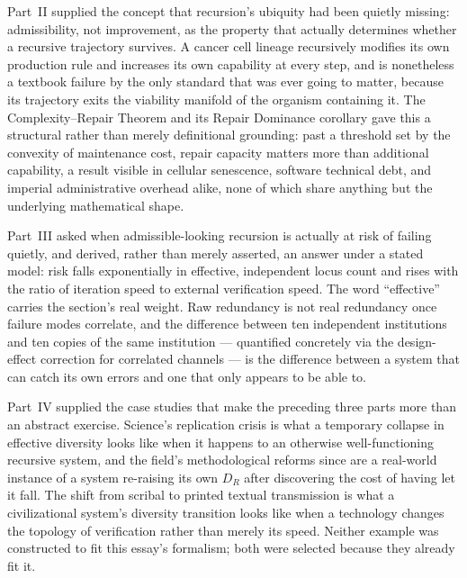 \documentclass[12pt,a4paper]{article}
\theoremstyle{plain}
\theoremstyle{definition}
\theoremstyle{remark}
\newcommand{\DR}{D_R}
\begin{document}
Part~II supplied the concept that recursion's ubiquity had been quietly missing: admissibility, not improvement, as the property that actually determines whether a recursive trajectory survives. A cancer cell lineage recursively modifies its own production rule and increases its own capability at every step, and is nonetheless a textbook failure by the only standard that was ever going to matter, because its trajectory exits the viability manifold of the organism containing it. The Complexity--Repair Theorem and its Repair Dominance corollary gave this a structural rather than merely definitional grounding: past a threshold set by the convexity of maintenance cost, repair capacity matters more than additional capability, a result visible in cellular senescence, software technical debt, and imperial administrative overhead alike, none of which share anything but the underlying mathematical shape.

Part~III asked when admissible-looking recursion is actually at risk of failing quietly, and derived, rather than merely asserted, an answer under a stated model: risk falls exponentially in effective, independent locus count and rises with the ratio of iteration speed to external verification speed. The word ``effective'' carries the section's real weight. Raw redundancy is not real redundancy once failure modes correlate, and the difference between ten independent institutions and ten copies of the same institution — quantified concretely via the design-effect correction for correlated channels — is the difference between a system that can catch its own errors and one that only appears to be able to.

Part~IV supplied the case studies that make the preceding three parts more than an abstract exercise. Science's replication crisis is what a temporary collapse in effective diversity looks like when it happens to an otherwise well-functioning recursive system, and the field's methodological reforms since are a real-world instance of a system re-raising its own $\DR$ after discovering the cost of having let it fall. The shift from scribal to printed textual transmission is what a civilizational system's diversity transition looks like when a technology changes the topology of verification rather than merely its speed. Neither example was constructed to fit this essay's formalism; both were selected because they already fit it.
\end{document}
